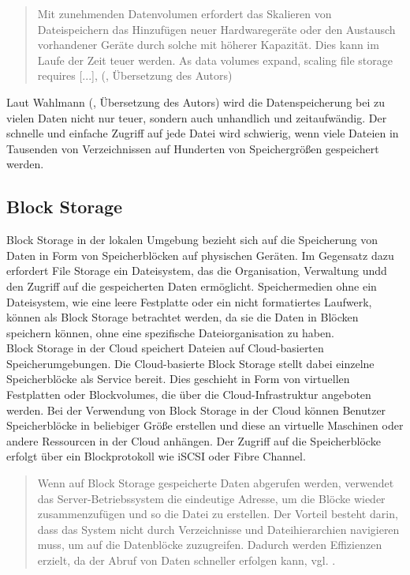 \begin{quote}
	Mit zunehmenden Datenvolumen erfordert das Skalieren von Dateispeichern das Hinzufügen neuer Hardwaregeräte oder den Austausch vorhandener Geräte durch solche mit höherer Kapazität. Dies kann im Laufe der Zeit teuer werden. \glqq As data volumes expand, scaling file storage requires [...]\grqq, (\cite{nx-fileScala}, Übersetzung des Autors)
\end{quote}

Laut Wahlmann (\citeyear{nx-fileScala}, Übersetzung des Autors) wird die Datenspeicherung bei zu vielen Daten nicht nur teuer, sondern auch unhandlich und zeitaufwändig. Der schnelle und einfache Zugriff auf jede Datei wird schwierig, wenn viele Dateien in Tausenden von Verzeichnissen auf Hunderten von Speichergrößen gespeichert werden. 

\newpage

\subsection{Block Storage}

Block Storage in der lokalen Umgebung bezieht sich auf die Speicherung von Daten in Form von Speicherblöcken auf physischen Geräten. Im Gegensatz dazu erfordert File Storage ein Dateisystem, das die Organisation, Verwaltung undd den Zugriff auf die gespeicherten Daten ermöglicht. Speichermedien ohne ein Dateisystem, wie eine leere Festplatte oder ein nicht formatiertes Laufwerk, können als Block Storage betrachtet werden, da sie die Daten in Blöcken speichern können, ohne eine spezifische Dateiorganisation zu haben.\\

Block Storage in der Cloud speichert Dateien auf Cloud-basierten Speicherumgebungen. Die Cloud-basierte Block Storage stellt dabei einzelne Speicherblöcke als Service bereit. Dies geschieht in Form von virtuellen Festplatten oder Blockvolumes, die über die Cloud-Infrastruktur angeboten werden. Bei der Verwendung von Block Storage in der Cloud können Benutzer Speicherblöcke in beliebiger Größe erstellen und diese an virtuelle Maschinen oder andere Ressourcen in der Cloud anhängen. Der Zugriff auf die Speicherblöcke erfolgt über ein Blockprotokoll wie iSCSI oder Fibre Channel.\\

\begin{quote}
	Wenn auf Block Storage gespeicherte Daten abgerufen werden, verwendet das Server-Betriebssystem die eindeutige Adresse, um die Blöcke wieder zusammenzufügen und so die Datei zu erstellen. Der Vorteil besteht darin, dass das System nicht durch Verzeichnisse und Dateihierarchien navigieren muss, um auf die Datenblöcke zuzugreifen. Dadurch werden Effizienzen erzielt, da der Abruf von Daten schneller erfolgen kann, vgl. \cite{ibm-storage}.
\end{quote}

